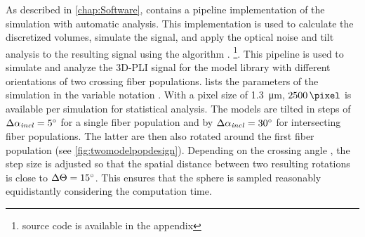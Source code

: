 % 
% 
%
As described in \cref{chap:Software}, \fastpli{} contains a pipeline implementation of the simulation with automatic analysis.
This implementation is used to calculate the discretized volumes, simulate the signal, and apply the optical noise and tilt analysis to the resulting signal using the algorithm \rofl{}. \footnote{source code is available in the appendix \dummy{}}.
This pipeline is used to simulate and analyze the \ac{3D-PLI} signal for the model library with different orientations of two crossing fiber populations.
 lists the parameters of the simulation in the variable notation \fastpli{}.
With a pixel size of \SI{1.3}{\micro\meter}, $\SI{2500}{\pixel}$ is available per simulation for statistical analysis.
The models are tilted in steps of $\Delta \textnormal{$\alpha_{\mathit{incl}}$} = \SI{5}{\degree}$ for a single fiber population and by $\Delta \textnormal{$\alpha_{\mathit{incl}}$} = \SI{30}{\degree}$ for intersecting fiber populations. The latter are then also rotated around the first fiber population (see \cref{fig:twomodelpopdesign}).
Depending on the crossing angle \modelOmega{}, the step size is adjusted so that the spatial distance between two resulting rotations is close to $\Delta \textnormal{$\Theta$} = \SI{15}{\degree}$.
This ensures that the sphere is sampled reasonably equidistantly considering the computation time.
% 
% 
% 
